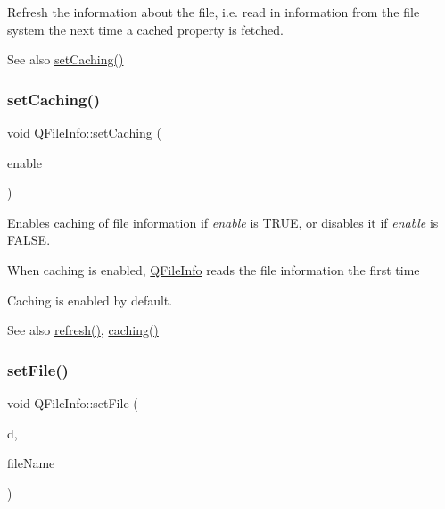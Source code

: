 Refresh the information about the file, i.\+e. read in information from the file system the next time a cached property is fetched.

\begin{DoxySeeAlso}{See also}
\mbox{\hyperlink{class_q_file_info_a9f2d5de0b83ff0c42b0004574ec9ddf5}{set\+Caching()}} 
\end{DoxySeeAlso}
\mbox{\label{class_q_file_info_a9f2d5de0b83ff0c42b0004574ec9ddf5}} 
\subsubsection{\texorpdfstring{setCaching()}{setCaching()}}
{\footnotesize\ttfamily void Q\+File\+Info\+::set\+Caching (\begin{DoxyParamCaption}\item[{bool}]{enable }\end{DoxyParamCaption})}

Enables caching of file information if {\itshape enable} is T\+R\+UE, or disables it if {\itshape enable} is F\+A\+L\+SE.

When caching is enabled, \mbox{\hyperlink{class_q_file_info}{Q\+File\+Info}} reads the file information the first time

Caching is enabled by default.

\begin{DoxySeeAlso}{See also}
\mbox{\hyperlink{class_q_file_info_a2e046cd4da1f8804c9f39e05921232c5}{refresh()}}, \mbox{\hyperlink{class_q_file_info_adf5d4a3e1c616dde6d932eaa9d7bce91}{caching()}} 
\end{DoxySeeAlso}
\mbox{\label{class_q_file_info_a12f26e174efbe009fbda56c5344db89a}} 
\subsubsection{\texorpdfstring{setFile()}{setFile()}\hspace{0.1cm}{\footnotesize\ttfamily [1/3]}}
{\footnotesize\ttfamily void Q\+File\+Info\+::set\+File (\begin{DoxyParamCaption}\item[{const \mbox{\hyperlink{class_q_dir}{Q\+Dir}} \&}]{d,  }\item[{const \mbox{\hyperlink{class_q_string}{Q\+String}} \&}]{file\+Name }\end{DoxyParamCaption})}

